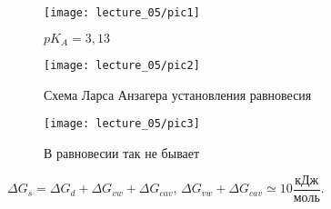\begin{lecture}
\begin{lecSection}
	\begin{figure}[H]
	\begin{minipage}[h]{0.26\linewidth}
		\centering\texttt{[image: lecture\_05/pic1]}
			\caption{$pK_A = 3,13$}
	\end{minipage}
	\hfill
	\begin{minipage}[h]{0.30\linewidth}
		\centering\texttt{[image: lecture\_05/pic2]}
			\caption{Схема Ларса Анзагера установления равновесия}
	\end{minipage}
	\hfill
	\begin{minipage}[h]{0.28\linewidth}
		\centering\texttt{[image: lecture\_05/pic3]}
		\caption{В равновесии так не бывает}
	\end{minipage}

	\end{figure}
	$\Delta G_s = \Delta G_d + \Delta G_{vw} + \Delta G_{cav}$, $\Delta G_{vw} + \Delta G_{cav} \simeq 10 \dfrac{\text{кДж}}{\text{моль}}$.
	\end{lecSection}
	
\end{lecture}